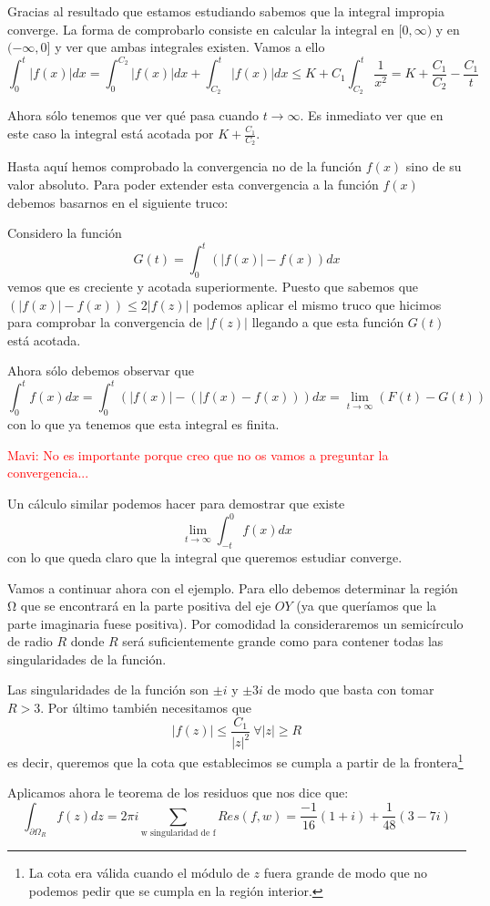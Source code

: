 \documentclass{apuntes}
\begin{document}
\begin{enumerate}
\begin{enumerate}
\begin{example}
Gracias al resultado que estamos estudiando sabemos que la integral impropia converge. La forma de comprobarlo consiste en calcular la integral en $[0,\infty)$ y en $(-\infty, 0]$ y ver que ambas integrales existen. Vamos a ello
\[\int_0^t |f(x)|dx = \int_0^{C_2}|f(x)|dx + \int_{C_2}^t |f(x)|dx \leq K+C_1\int_{C_2}^t \frac{1}{x^2}=K+\frac{C_1}{C_2}-\frac{C_1}{t}\]

Ahora sólo tenemos que ver qué pasa cuando $t \to \infty$. Es inmediato ver que en este caso la integral está acotada por $K+\frac{C_1}{C_2}$.

Hasta aquí hemos comprobado la convergencia no de la función $f(x)$ sino de su valor absoluto. Para poder extender esta convergencia a la función $f(x)$ debemos basarnos en el siguiente truco:

Considero la función
\[G(t)=\int_0^t \left( |f(x)|-f(x)\right)dx\]
vemos que es creciente y acotada superiormente. Puesto que sabemos que $\left( |f(x)|-f(x)\right) \leq 2|f(z)|$ podemos aplicar el mismo truco que hicimos para comprobar la convergencia de $|f(z)|$ llegando a que esta función $G(t)$ está acotada.

Ahora sólo debemos observar que
\[\int_0^tf(x)dx = \int_0^t \left( |f(x)|-(|f(x)-f(x))\right)dx = \lim_{t \to \infty} (F(t)-G(t))\]
con lo que ya tenemos que esta integral es finita.

\textcolor{red}{Mavi: No es importante porque creo que no os vamos a preguntar la convergencia...}

Un cálculo similar podemos hacer para demostrar que existe
\[\lim_{t \to \infty} \int_{-t}^0 f(x)dx\]
con lo que queda claro que la integral que queremos estudiar converge.

Vamos a continuar ahora con el ejemplo. Para ello debemos determinar la región Ω que se encontrará en la parte positiva del eje $OY$ (ya que queríamos que la parte imaginaria fuese positiva). Por comodidad la consideraremos un semicírculo de radio $R$ donde $R$ será suficientemente grande como para contener todas las singularidades de la función.

Las singularidades de la función son $\pm i$ y $\pm 3i$ de modo que basta con tomar $R>3$. Por último también necesitamos que
\[|f(z)| \leq \frac{C_1}{|z|^2} \ \forall |z| \geq R\]
es decir, queremos que la cota que establecimos se cumpla a partir de la frontera\footnote{La cota era válida cuando el módulo de $z$ fuera grande de modo que no podemos pedir que se cumpla en la región interior.}

Aplicamos ahora le teorema de los residuos que nos dice que:
\[\int_{\partial Ω_R} f(z)dz = 2πi\sum_{\text{w singularidad de f}} Res(f,w) = \frac{-1}{16}(1+i)+\frac{1}{48}(3-7i)\]


\end{example}
\end{enumerate}
\end{enumerate}
\end{document}
